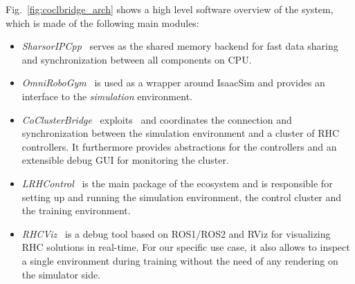 Fig.~\ref{fig:coclbridge_arch} shows a high level software overview of the system, which is made of the following main modules:
\begin{itemize}
	\item \textit{SharsorIPCpp}~\cite{mystuff::sharsoripcpp} serves as the shared memory backend for fast data sharing and synchronization between all components on CPU.
	\item \textit{OmniRoboGym}~\cite{mystuff::omnirobogym} is used as a wrapper around IsaacSim and provides an interface to the \textit{simulation} environment.
	\item \textit{CoClusterBridge}~\cite{mystuff::coclusterbridge} exploits~\cite{mystuff::sharsoripcpp} and coordinates the connection and synchronization between the simulation environment and a cluster of RHC controllers. It furthermore provides abstractions for the controllers and an extensible debug GUI for monitoring the cluster.
	\item \textit{LRHControl}~\cite{mystuff::lrhccontrol} is the main package of the ecosystem and is responsible for setting up and running the simulation environment, the control cluster and the training environment.
	\item \textit{RHCViz}~\cite{mystuff::rhcviz} is a debug tool based on ROS1/ROS2 and RViz for visualizing RHC solutions in real-time. For our specific use case, it also allows to inspect a single environment during training without the need of any rendering on the simulator side.
\end{itemize}




